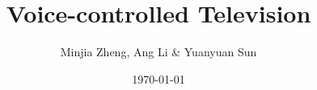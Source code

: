 \documentclass{beamer}
\title{Voice-controlled Television}
\author{Minjia Zheng, Ang Li \& Yuanyuan Sun}
\date{\today}
\begin{document}
\frame{\titlepage}




\begin{frame}

\end{frame}
\end{document}
